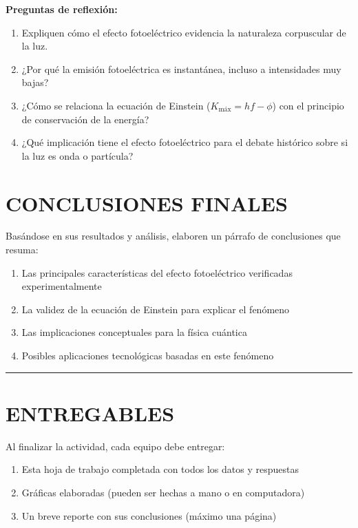 \documentclass[12pt,a4paper]{article}
\begin{document}
	\begin{preguntabox}
		\textbf{Preguntas de reflexión:}
		\begin{enumerate}
			\item Expliquen cómo el efecto fotoeléctrico evidencia la naturaleza corpuscular de la luz.
			\item ¿Por qué la emisión fotoeléctrica es instantánea, incluso a intensidades muy bajas?
			\item ¿Cómo se relaciona la ecuación de Einstein ($K_{\text{máx}} = hf - \phi$) con el principio de conservación de la energía?
			\item ¿Qué implicación tiene el efecto fotoeléctrico para el debate histórico sobre si la luz es onda o partícula?
		\end{enumerate}
	\end{preguntabox}
	
	\section*{CONCLUSIONES FINALES}
	
	Basándose en sus resultados y análisis, elaboren un párrafo de conclusiones que resuma:
	\begin{enumerate}
		\item Las principales características del efecto fotoeléctrico verificadas experimentalmente
		\item La validez de la ecuación de Einstein para explicar el fenómeno
		\item Las implicaciones conceptuales para la física cuántica
		\item Posibles aplicaciones tecnológicas basadas en este fenómeno
	\end{enumerate}
	
	\vspace{3cm}
	\hrule
	\vspace{0.3cm}
	
	\section*{ENTREGABLES}
	
	Al finalizar la actividad, cada equipo debe entregar:
	\begin{enumerate}
		\item Esta hoja de trabajo completada con todos los datos y respuestas
		\item Gráficas elaboradas (pueden ser hechas a mano o en computadora)
		\item Un breve reporte con sus conclusiones (máximo una página)
	\end{enumerate}
	
\end{document}
